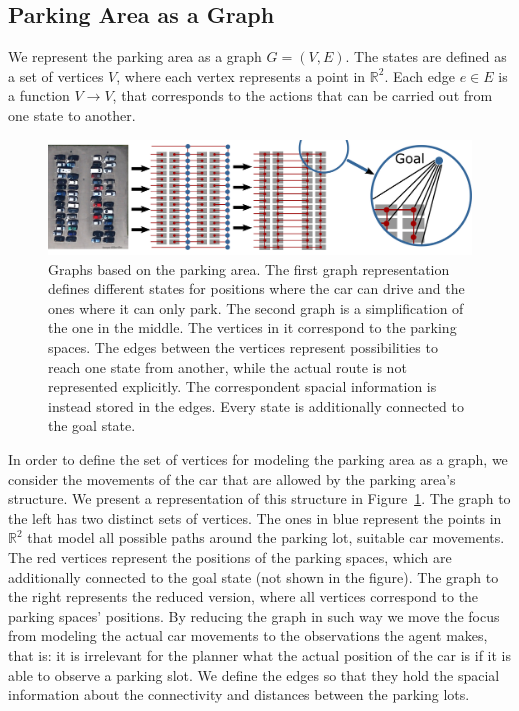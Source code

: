 \subsection{Parking Area as a Graph} %
\label{sub:parking_area_as_a_graph_}

We represent the parking area as a graph $G = (V,E)$. The states are defined
as a set of vertices $V$, where each vertex represents a point in
$\mathbb{R}^2$. Each edge $e \in E$ is a function $V \rightarrow V$, that
corresponds to the actions that can be carried out from one state to another.

\begin{figure}[t]
    \begin{center}
        \includegraphics[width=\textwidth]{pictures/graph.pdf}
    \end{center}
    \caption{Graphs based on the parking area. The first graph representation defines different states for positions where the car can drive and the ones where it can only park.
    The second graph is a simplification of the one in the middle. The vertices in it correspond to the parking spaces. The edges between the vertices represent possibilities to reach one state from another, while the actual route is not represented explicitly. The correspondent spacial information is instead stored in the edges. Every state is additionally connected to the goal state.}
    \vspace{-5mm}
    \label{fig:graph}
\end{figure}


In order to define the set of vertices for modeling the parking area as a
graph, we consider the movements of the car that are allowed by the parking
area's structure. We present a representation of this structure in
Figure~\ref{fig:graph}. The graph to the left has two distinct sets of
vertices. The ones in blue represent the points in $\mathbb{R}^2$ that model
all possible paths around the parking lot, suitable car movements. The red
vertices represent the positions of the parking spaces, which are additionally
connected to the goal state (not shown in the figure). The graph to the right
represents the reduced version, where all vertices correspond to the parking
spaces' positions. By reducing the graph in such way we move the focus from
modeling the actual car movements to the observations the agent makes, that
is: it is irrelevant for the planner what the actual position of the car is if
it is able to observe a parking slot. We define the edges so that they hold
the spacial information about the connectivity and distances between the
parking lots.

